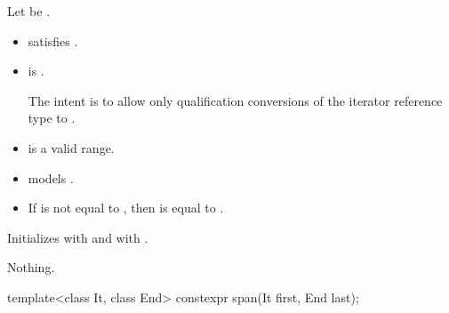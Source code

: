 \begin{itemdescr}
\pnum
\constraints
Let  be .
\begin{itemize}
\item {} satisfies .
\item
{} is .
\begin{note}
The intent is to allow only qualification conversions
of the iterator reference type to .
\end{note}
\end{itemize}

\pnum
\expects
\begin{itemize}
\item {} is a valid range.
\item {} models .
\item
If  is not equal to ,
then  is equal to .
\end{itemize}

\pnum
\effects
Initializes  with  and
 with .

\pnum
\throws
Nothing.
\end{itemdescr}

%
\begin{itemdecl}
template<class It, class End>
  constexpr span(It first, End last);
\end{itemdecl}

